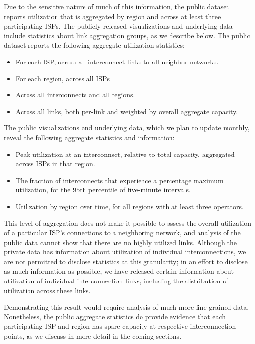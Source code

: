 Due to the sensitive nature of much of this information, 
the public dataset reports utilization that is aggregated by region and
across at least three participating ISPs.
The
publicly released visualizations and underlying data include 
statistics about link aggregation groups, as we describe below.
The public dataset reports the following aggregate utilization statistics:
\begin{itemize}
\item For each ISP, across all interconnect links
  to all neighbor networks.
\item For each region, across all ISPs
\item Across all interconnects and all regions.
\item Across all links, both per-link and weighted by overall aggregate capacity.
\end{itemize}
\noindent
The public visualizations and underlying data, which we plan
to update monthly, reveal the following aggregate statistics and information: 
\begin{itemize}
\item Peak utilization at an interconnect, relative to total capacity, aggregated across ISPs in that region.
\item The fraction of interconnects that experience a percentage maximum
utilization, for the 95th percentile of five-minute intervals.
\item Utilization by region over time, for all regions with at least three operators.
\end{itemize}
\noindent
This level of aggregation does not make it possible to assess the
overall utilization of a particular ISP's connections to a neighboring
network, and analysis of the public data cannot show that there are no
highly utilized links. Although the private data has information about
utilization of individual interconnections, we are not permitted to
disclose statistics at this granularity; in an effort to disclose as
much information as possible, we have released certain information about
utilization of individual interconnection links, including the
distribution of utilization across these links.

 Demonstrating this result would require analysis of much more
fine-grained data.  Nonetheless, the public aggregate statistics
do provide evidence that each participating ISP and region has spare
capacity at respective interconnection points, as we discuss in more
detail in the coming sections.